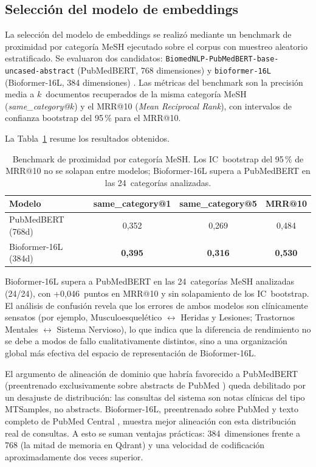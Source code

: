 \documentclass[11pt,a4paper,spanish]{book}
\numberwithin{equation}{chapter}
\numberwithin{figure}{chapter}
\begin{document}
\subsection{Selección del modelo de embeddings}
\label{sec:c5_embedding}

La selección del modelo de embeddings se realizó mediante un benchmark de proximidad por categoría MeSH ejecutado sobre el corpus con muestreo aleatorio estratificado. Se evaluaron dos candidatos: \texttt{BiomedNLP-PubMedBERT-base-uncased-abstract} (PubMedBERT, 768 dimensiones) \cite{gu_pubmedbert_2021} y \texttt{bioformer-16L} (Bioformer-16L, 384 dimensiones) \cite{fang2023bioformerefficienttransformerlanguage}. Las métricas del benchmark son la precisión media a $k$~documentos recuperados de la misma categoría MeSH (\textit{same\_category@}$k$) y el MRR@10 (\textit{Mean Reciprocal Rank}), con intervalos de confianza bootstrap del 95\,\% para el MRR@10.

La Tabla~\ref{tab:c5_embedding_bench} resume los resultados obtenidos.

\begin{table}[h]
\centering
\begin{tabular}{|l|c|c|c|}
\hline
\textbf{Modelo} & \textbf{same\_category@1} & \textbf{same\_category@5} & \textbf{MRR@10} \\
\hline
PubMedBERT (768d) & 0{,}352 & 0{,}269 & 0{,}484 \\
Bioformer-16L (384d) & \textbf{0{,}395} & \textbf{0{,}316} & \textbf{0{,}530} \\
\hline
\end{tabular}
\caption{Benchmark de proximidad por categoría MeSH. Los IC~bootstrap del 95\,\% de MRR@10 no se solapan entre modelos; Bioformer-16L supera a PubMedBERT en las 24~categorías analizadas.}
\label{tab:c5_embedding_bench}
\end{table}

Bioformer-16L supera a PubMedBERT en las 24~categorías MeSH analizadas (24/24), con +0{,}046~puntos en MRR@10 y sin solapamiento de los IC~bootstrap. El análisis de confusión revela que los errores de ambos modelos son clínicamente sensatos (por ejemplo, Musculoesquelético $\leftrightarrow$ Heridas y Lesiones; Trastornos Mentales $\leftrightarrow$ Sistema Nervioso), lo que indica que la diferencia de rendimiento no se debe a modos de fallo cualitativamente distintos, sino a una organización global más efectiva del espacio de representación de Bioformer-16L.

El argumento de alineación de dominio que habría favorecido a PubMedBERT (preentrenado exclusivamente sobre abstracts de PubMed \cite{gu_pubmedbert_2021}) queda debilitado por un desajuste de distribución: las consultas del sistema son notas clínicas del tipo MTSamples, no abstracts. Bioformer-16L, preentrenado sobre PubMed y texto completo de PubMed Central \cite{fang2023bioformerefficienttransformerlanguage}, muestra mejor alineación con esta distribución real de consultas. A esto se suman ventajas prácticas: 384~dimensiones frente a 768 (la mitad de memoria en Qdrant) y una velocidad de codificación aproximadamente dos veces superior.
\end{document}
